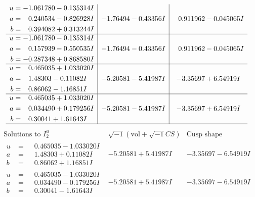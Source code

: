 \documentclass[1p]{elsarticle_modified}
\theoremstyle{definition}
\newcommand{\I}{\sqrt{-1}}
\begin{document}
$$\begin{array}{c|c|c}
\begin{aligned}
u &= -1.061780 - 0.135314 I \\
a &= \phantom{-}0.240534 - 0.826928 I \\
b &= \phantom{-}0.394082 + 0.313244 I\end{aligned}
 & -1.76494 - 0.43356 I & \phantom{-}0.911962 - 0.045065 I \\ \hline\begin{aligned}
u &= -1.061780 - 0.135314 I \\
a &= \phantom{-}0.157939 - 0.550535 I \\
b &= -0.287348 + 0.868580 I\end{aligned}
 & -1.76494 - 0.43356 I & \phantom{-}0.911962 - 0.045065 I \\ \hline\begin{aligned}
u &= \phantom{-}0.465035 + 1.033020 I \\
a &= \phantom{-}1.48303 - 0.11082 I \\
b &= \phantom{-}0.86062 - 1.16851 I\end{aligned}
 & -5.20581 - 5.41987 I & -3.35697 + 6.54919 I \\ \hline\begin{aligned}
u &= \phantom{-}0.465035 + 1.033020 I \\
a &= \phantom{-}0.034490 + 0.179256 I \\
b &= \phantom{-}0.30041 + 1.61643 I\end{aligned}
 & -5.20581 - 5.41987 I & -3.35697 + 6.54919 I\\
 \hline 
 \end{array}$$\newpage$$\begin{array}{c|c|c}  
\text{Solutions to }I^u_{2}& \I (\text{vol} + \sqrt{-1}CS) & \text{Cusp shape}\\
 \hline 
\begin{aligned}
u &= \phantom{-}0.465035 - 1.033020 I \\
a &= \phantom{-}1.48303 + 0.11082 I \\
b &= \phantom{-}0.86062 + 1.16851 I\end{aligned}
 & -5.20581 + 5.41987 I & -3.35697 - 6.54919 I \\ \hline\begin{aligned}
u &= \phantom{-}0.465035 - 1.033020 I \\
a &= \phantom{-}0.034490 - 0.179256 I \\
b &= \phantom{-}0.30041 - 1.61643 I\end{aligned}
 & -5.20581 + 5.41987 I & -3.35697 - 6.54919 I \\ \hline\begin{aligned}

\end{aligned}
\end{array}$$
\end{document}
